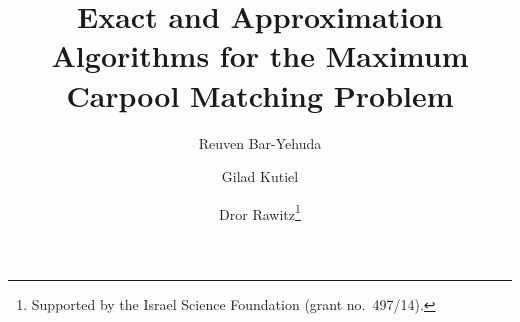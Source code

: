 \title
{Exact and Approximation Algorithms for the Maximum Carpool Matching Problem}

\author{
	Reuven Bar-Yehuda \and
	Gilad Kutiel \and
	Dror Rawitz\thanks{Supported by the Israel Science Foundation (grant no.~497/14).}
}

